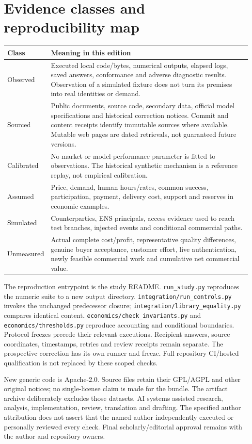 \section{Evidence classes and reproducibility map}

\begin{longtable}{>{\raggedright\arraybackslash}p{}p{}}
\toprule
Class & Meaning in this edition\\
\midrule\endhead
Observed & Executed local code/bytes, numerical outputs, elapsed logs, saved answers, conformance and adverse diagnostic results. Observation of a simulated fixture does not turn its premises into real identities or demand.\\
Sourced & Public documents, source code, secondary data, official model specifications and historical correction notices. Commit and content receipts identify immutable sources where available. Mutable web pages are dated retrievals, not guaranteed future versions.\\
Calibrated & No market or model-performance parameter is fitted to observations. The historical synthetic mechanism is a reference replay, not empirical calibration.\\
Assumed & Price, demand, human hours/rates, common success, participation, payment, delivery cost, support and reserves in economic examples.\\
Simulated & Counterparties, ENS principals, access evidence used to reach test branches, injected events and conditional commercial paths.\\
Unmeasured & Actual complete cost/profit, representative quality differences, genuine buyer acceptance, customer effort, live authentication, newly feasible commercial work and cumulative net commercial value.\\
\bottomrule
\end{longtable}

The reproduction entrypoint is the study README. \texttt{run\_study.py} reproduces the numeric suite to a new output directory. \texttt{integration/run\_controls.py} invokes the unchanged predecessor closure; \texttt{integration/library\_equality.py} compares identical content. \texttt{economics/check\_invariants.py} and \texttt{economics/thresholds.py} reproduce accounting and conditional boundaries. Protocol freezes precede their relevant executions. Recipient answers, source coordinates, timestamps, retries and review receipts remain separate. The prospective correction has its own runner and freeze. Full repository CI/hosted qualification is not replaced by these scoped checks.

New generic code is Apache-2.0. Source files retain their GPL/AGPL and other original notices; no single-license claim is made for the bundle. The artifact archive deliberately excludes those datasets. AI systems assisted research, analysis, implementation, review, translation and drafting. The specified author attribution does not assert that the named author independently executed or personally reviewed every check. Final scholarly/editorial approval remains with the author and repository owners.
